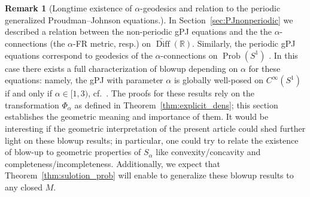 \documentclass[11pt,reqno]{amsart}
\theoremstyle{definition}
\newtheorem{remark}[theorem]{Remark}
\newcommand{\DiffRshift}{\widetilde{\operatorname{Diff}}(\mathbb R)}
\begin{document}
\begin{remark}[Longtime existence of $\alpha$-geodesics and relation to the periodic generalized Proudman--Johnson equations.]
In Section~\ref{sec:PJnonperiodic} we described a relation between the non-periodic gPJ equations and the the $\alpha$-connections (the $\alpha$-FR metric, resp.) on $\DiffRshift$. 
Similarly, the periodic gPJ equations correspond to geodesics of the $\alpha$-connections on $\operatorname{Prob}(S^1)$ \cite{lenells2014amari}. 
In this case there exists a full characterization of blowup depending on $\alpha$ for these equations: namely,  the gPJ with parameter $\alpha$ is globally well-posed on $C^{\infty}(S^1)$ if and only if $\alpha\in [1,3)$, cf.~\cite{kogelbauer2020global,sarria2013blow}. 
The proofs for these results rely 
on the transformation $\Phi_{\alpha}$ as defined in Theorem~\ref{thm:explicit_dens}; this section establishes the geometric meaning and importance of them.
It would be interesting if the geometric interpretation of the present article could shed further light on these blowup results; in particular, one could try to relate the existence of blow-up to geometric properties of $S_\alpha$ like convexity/concavity and completeness/incompleteness.
Additionally, we expect that Theorem~\ref{thm:sulotion_prob} will enable to generalize these blowup results to any closed $M$.
\end{remark}





\end{document}

